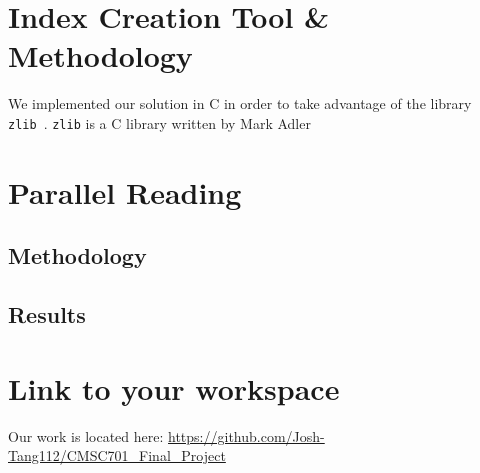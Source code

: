 \documentclass[10pt]{article}
\newcommand{\zlib}{\texttt{zlib}\xspace}
\begin{document}
\section{Index Creation Tool \& Methodology}

We implemented our solution in C in order to take advantage of the library
\zlib~\cite{zlib}. \zlib is a C library written by Mark Adler

\section{Parallel Reading}

\subsection{Methodology}

\subsection{Results}

\section{Link to your workspace}

Our work is located here:
\url{https://github.com/Josh-Tang112/CMSC701_Final_Project}



\end{document}
